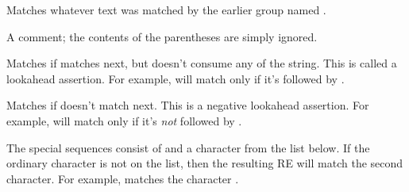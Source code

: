\begin{list}{}{\leftmargin \MyLeftMargin {} \MyLabelWidth}
\item[\code{(?P=\var{name})}] Matches whatever text was matched by the
earlier group named .

\item[\code{(?\#...)}] A comment; the contents of the parentheses are
simply ignored.

\item[\code{(?=...)}] Matches if  matches next, but doesn't
consume any of the string.  This is called a lookahead assertion.  For
example,  will match  only if it's
followed by .

\item[\code{(?!...)}] Matches if  doesn't match next.  This
is a negative lookahead assertion.  For example,
 will match  only if it's \emph{not}
followed by .

\end{list}

The special sequences consist of \character{\e} and a character from the
list below.  If the ordinary character is not on the list, then the
resulting RE will match the second character.  For example,
\regexp{\e\$} matches the character \character{\$}.

